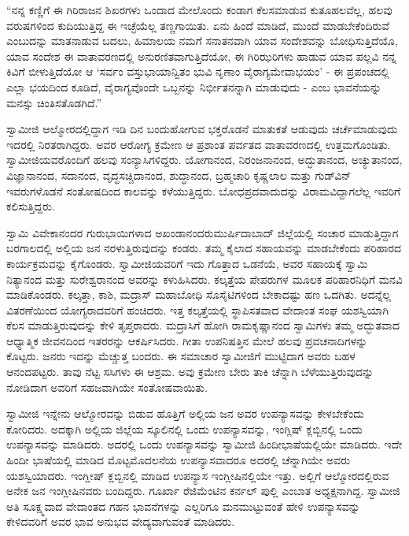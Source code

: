  “ನನ್ನ ಕಣ್ಣಿಗೆ ಈ ಗಿರಿರಾಜನ ಶಿಖರಗಳು ಒಂದಾದ ಮೇಲೊಂದು ಕಂಡಾಗ ಕೆಲಸಮಾಡುವ ಕುತೂಹಲವೆಲ್ಲ, ಹಲವು ವರುಷಗಳಿಂದ ಕುದಿಯುತ್ತಿದ್ದ ಈ ಇಚ್ಛೆಯೆಲ್ಲ ತಣ್ಣಗಾಯಿತು. ಏನು ಹಿಂದೆ ಮಾಡಿದೆ, ಮುಂದೆ ಮಾಡಬೇಕೆಂದಿರುವೆ ಎಂಬುದನ್ನು ಮಾತನಾಡುವ ಬದಲು, ಹಿಮಾಲಯ ನಮಗೆ ಸನಾತನವಾಗಿ ಯಾವ ಸಂದೇಶವನ್ನು ಬೋಧಿಸುತ್ತಿದೆಯೊ, ಯಾವ ಸಂದೇಶ ಈ ವಾತಾವರಣದಲ್ಲಿ ಅನುರಣಿತವಾಗುತ್ತಿದೆಯೋ, ಈ ಗಿರಿಝರಿಗಳು ಹಾಡುವ ಯಾವ ಪಲ್ಲವಿ ನನ್ನ ಕಿವಿಗೆ ಬೀಳುತ್ತಿದೆಯೋ ಆ ‘ಸರ್ವಂ ವಸ್ತುಭಾಯಾನ್ವಿತಂ ಭುವಿ ನೃಣಾಂ ವೈರಾಗ್ಯಮೇವಾಭಯಂ’ - ಈ ಪ್ರಪಂಚದಲ್ಲಿ ಎಲ್ಲಾ ಭಯದಿಂದ ಕೂಡಿದೆ, ವೈರಾಗ್ಯವೊಂದೇ ಒಬ್ಬನನ್ನು ನಿರ್ಭೀತನನ್ನಾಗಿ ಮಾಡುವುದು - ಎಂಬ ಭಾವನೆಯನ್ನು ಮನಸ್ಸು ಚಿಂತಿಸತೊಡಗಿದೆ.” 

 ಸ್ವಾಮೀಜಿ ಆಲ್ಮೋರದಲ್ಲಿದ್ದಾಗ ಇಡಿ ದಿನ ಬಂದುಹೋಗುವ ಭಕ್ತರೊಡನೆ ಮಾತುಕತೆ ಆಡುವುದು ಚರ್ಚೆಮಾಡುವುದು ಇದರಲ್ಲಿ ನಿರತರಾಗಿದ್ದರು. ಅವರ ಆರೋಗ್ಯ ಕ್ರಮೇಣ ಆ ಪ್ರಶಾಂತ ಪರ್ವತದ ವಾತಾವರಣದಲ್ಲಿ ಉತ್ತಮಗೊಂಡಿತು. ಸ್ವಾಮೀಜಿಯವರೊಂದಿಗೆ ಹಲವು ಸಂನ್ಯಾಸಿಗಳಿದ್ದರು. ಯೋಗಾನಂದ, ನಿರಂಜನಾನಂದ, ಅದ್ಭುತಾನಂದ, ಅಚ್ಯುತಾನಂದ, ವಿಜ್ಞಾನಾನಂದ, ಸದಾನಂದ, ವೃದ್ಧಸಚ್ಚಿದಾನಂದ, ಶುದ್ಧಾನಂದ, ಬ್ರಹ್ಮಚಾರಿ ಕೃಷ್ಣಲಾಲ ಮತ್ತು ಗುಡ್‍ವಿನ್ ಇವರುಗಳೊಡನೆ ಸಂತೋಷದಿಂದ ಕಾಲವನ್ನು ಕಳೆಯುತ್ತಿದ್ದರು. ಬೋಧಪ್ರದವಾದುದನ್ನು ವಿರಾಮವಿದ್ದಾಗಲೆಲ್ಲ ಇವರಿಗೆ ಕಲಿಸುತ್ತಿದ್ದರು. 

 ಸ್ವಾಮಿ ವಿವೇಕಾನಂದರ ಗುರುಭಾಯಿಗಳಾದ ಅಖಂಡಾನಂದರು\break ಮುರ್ಷಿದಾಬಾದ್ ಜಿಲ್ಲೆಯಲ್ಲಿ ಸಂಚಾರ ಮಾಡುತ್ತಿದ್ದಾಗ ಬರಗಾಲದಲ್ಲಿ ಅಲ್ಲಿಯ ಜನ ನರಳುತ್ತಿರುವುದನ್ನು ಕಂಡರು. ತಮ್ಮ ಕೈಲಾದ ಸಹಾಯವನ್ನು ಮಾಡಬೇಕೆಂದು ಪರಿಹಾರದ ಕಾರ್ಯಕ್ರಮವನ್ನು ಕೈಗೊಂಡರು. ಸ್ವಾಮೀಜಿಯವರಿಗೆ ಇದು ಗೊತ್ತಾದ ಒಡನೆಯೆ, ಅವರ ಸಹಾಯಕ್ಕೆ ಸ್ವಾಮಿ ನಿತ್ಯಾನಂದ ಮತ್ತು ಸುರೇಶ್ವರಾನಂದ ಅವರನ್ನು ಕಳುಹಿಸಿದರು. ಕಲ್ಕತ್ತೆಯ ಪೇಪರುಗಳ ಮೂಲಕ ಪರಿಹಾರನಿಧಿಗೆ ಮನವಿ ಮಾಡಿಕೊಂಡರು. ಕಲ್ಕತ್ತಾ, ಕಾಶಿ, ಮದ್ರಾಸ್ ಮಹಾಬೋಧಿ ಸೊಸೈಟಿಗಳಿಂದ ಬೇಕಾದಷ್ಟು ಹಣ ಒದಗಿತು. ಅದನ್ನೆಲ್ಲ ವಿತರಣೆಯಿಂದ ಯೋಗ್ಯರಾದವರಿಗೆ ಹಂಚಿದರು. ಇತ್ತ ಕಲ್ಕತ್ತೆಯಲ್ಲಿ ಸ್ಥಾಪಿಸತವಾದ ವೇದಾಂತ ಸಂಘ ಯಶಸ್ವಿಯಾಗಿ ಕೆಲಸ ಮಾಡುತ್ತಿರುವುದನ್ನು ಕೇಳಿ ತೃಪ್ತರಾದರು. ಮದ್ರಾಸಿಗೆ ಹೋಗಿ ರಾಮಕೃಷ್ಣಾನಂದ ಸ್ವಾಮಿಗಳು ತಮ್ಮ ಅದ್ಭುತವಾದ ಆಧ್ಯಾತ್ಮಿಕ ಜೀವನದಿಂದ ಇತರರನ್ನು ಆಕರ್ಷಿಸಿದರು. ಗೀತಾ ಉಪನಿಷತ್ತಿನ ಮೇಲೆ ಹಲವು ಪ್ರವಚನಾದಿಗಳನ್ನು ಕೊಟ್ಟರು. ಜನರು ಇದನ್ನು ಮೆಚ್ಚುತ್ತ ಬಂದರು. ಈ ಸಮಾಚಾರ ಸ್ವಾಮೀಜಿಗೆ ಮುಟ್ಟಿದಾಗ ಅವರು ಬಹಳ ಆನಂದಪಟ್ಟರು. ತಾವು ನೆಟ್ಟ ಸಸಿಗಳು ಈ ಆಶ್ರಮ. ಅವು ಕ್ರಮೇಣ ಬೇರು ತಾಕಿ ಚೆನ್ನಾಗಿ ಬೆಳೆಯುತ್ತಿರುವುದನ್ನು ನೋಡಿದಾಗ ಅವರಿಗೆ ಸಹಜವಾಗಿಯೇ ಸಂತೋಷವಾಯಿತು. 

 ಸ್ವಾಮೀಜಿ ಇನ್ನೇನು ಆಲ್ಮೋರವನ್ನು ಬಿಡುವ ಹೊತ್ತಿಗೆ ಅಲ್ಲಿಯ ಜನ ಅವರ ಉಪನ್ಯಾಸವನ್ನು ಕೇಳಬೇಕೆಂದು ಕೋರಿದರು. ಅದಕ್ಕಾಗಿ ಅಲ್ಲಿಯ ಜಿಲ್ಲೆಯ ಸ್ಕೂಲಿನಲ್ಲಿ ಒಂದು ಉಪನ್ಯಾಸವನ್ನು, ಇಂಗ್ಲಿಷ್ ಕ್ಲಬ್ಬಿನಲ್ಲಿ ಒಂದು ಉಪನ್ಯಾಸವನ್ನು ಮಾಡಿದರು. ಅದರಲ್ಲಿ ಒಂದು ಉಪನ್ಯಾಸವನ್ನು ಸ್ವಾಮೀಜಿ ಹಿಂದೀಭಾಷೆಯಲ್ಲಿಯೇ ಮಾಡಿದರು. ಇದೇ ಹಿಂದೀ ಭಾಷೆಯಲ್ಲಿ ಮಾಡಿದ ಮೊಟ್ಟಮೊದಲನೆಯ ಉಪನ್ಯಾಸವಾದರೂ ಅದರಲ್ಲಿ ಚೆನ್ನಾಗಿಯೇ ಅವರು ಯಶಸ್ವಿಯಾದರು. ಇಂಗ್ಲೀಷ್ ಕ್ಲಬ್ಬಿನಲ್ಲಿ ಮಾಡಿದ ಉಪನ್ಯಾಸ ಇಂಗ್ಲೀಷಿನಲ್ಲಿಯೇ ಇತ್ತು. ಅಲ್ಲಿಗೆ ಆಲ್ಮೋರದಲ್ಲಿರುವ ಅನೇಕ ಜನ ಇಂಗ್ಲೀಷಿನವರು ಬಂದಿದ್ದರು. ಗೂರ್ಖಾ ರೆಜಿಮೆಂಟಿನ ಕರ್ನಲ್ ಪುಲ್ಲಿ ಎಂಬಾತ ಅಧ್ಯಕ್ಷನಾಗಿದ್ದ. ಸ್ವಾಮೀಜಿ ಅತಿ ಸೂಕ್ಷ್ಮವಾದ ವೇದಾಂತದ ಗಹನ ಭಾವನೆಗಳನ್ನು ಎಲ್ಲರಿಗೂ ಮನಮುಟ್ಟುವಂತೆ ಹೇಳಿ ಉಪನ್ಯಾಸವನ್ನು ಕೇಳಿದವರಿಗೆ ಅವರ ಭಾವ ಅನುಭವ ವೇದ್ಯವಾಗುವಂತೆ ಮಾಡಿದರು. 

